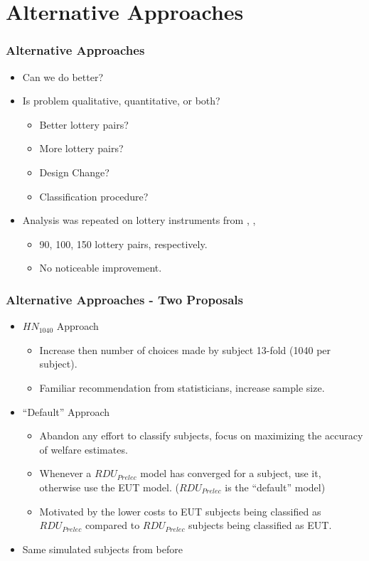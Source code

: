 \documentclass{beamer}
\begin{document}
\section{Alternative Approaches}
\begin{frame}
\frametitle{Alternative Approaches}
\begin{itemize}
	\item Can we do better?
	\item Is problem qualitative, quantitative, or both?
		\begin{itemize}
			\item Better lottery pairs?
			\item More lottery pairs?
			\item Design Change?
			\item Classification procedure?
		\end{itemize}
	\item Analysis was repeated on lottery instruments from \textcite{Hey1994}, \textcite{Loomes2002}, \textcite{Schmidt2004}
		\begin{itemize}
			\item 90, 100, 150 lottery pairs, respectively.
			\item No noticeable improvement.
		\end{itemize}
\end{itemize}
\end{frame}

\begin{frame}
\frametitle{Alternative Approaches - Two Proposals}
\begin{itemize}
	\item ${HN}_{1040}$ Approach
		\begin{itemize}
			\item Increase then number of choices made by subject 13-fold (1040 per subject).
			\item Familiar recommendation from statisticians, increase sample size.
		\end{itemize}
	\item \enquote{Default} Approach
		\begin{itemize}
			\item Abandon any effort to classify subjects, focus on maximizing the accuracy of welfare estimates.
			\item Whenever a $\mathit{RDU_{Prelec}}$ model has converged for a subject, use it, otherwise use the EUT model. ($\mathit{RDU_{Prelec}}$ is the \enquote{default} model)
			\item Motivated by the lower costs to EUT subjects being classified as $\mathit{RDU_{Prelec}}$ compared to $\mathit{RDU_{Prelec}}$ subjects being classified as EUT.
		\end{itemize}
	\item Same simulated subjects from before
\end{itemize}
\end{frame}
\end{document}
